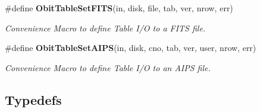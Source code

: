 \begin{CompactItemize}
\#define {\bf Obit\-Table\-Set\-FITS}(in, disk, file, tab, ver, nrow, err)
\begin{CompactList}\small\item\em Convenience Macro to define Table I/O to a FITS file. \item\end{CompactList}\item 
\#define {\bf Obit\-Table\-Set\-AIPS}(in, disk, cno, tab, ver, user, nrow, err)
\begin{CompactList}\small\item\em Convenience Macro to define Table I/O to an AIPS file. \item\end{CompactList}\end{CompactItemize}
\subsection*{Typedefs}
